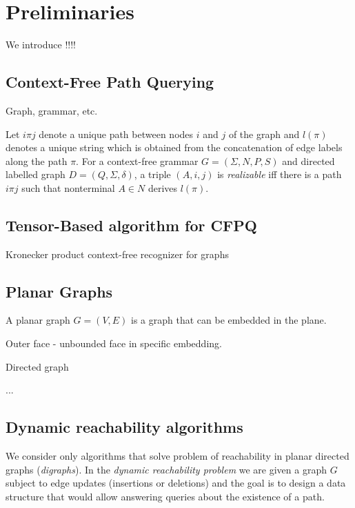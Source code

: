\section{Preliminaries}

We introduce !!!!

\subsection{Context-Free Path Querying}

Graph, grammar, etc.

Let $i\pi j$ denote a unique path between nodes $i$ and $j$ of the graph and $l(\pi)$ denotes a unique string which is obtained from the concatenation of edge labels along the path $\pi$.
For a context-free grammar $G = (\Sigma, N, P, S)$ and directed labelled graph $D = (Q, \Sigma, \delta)$, a triple $(A, i, j)$ is \textit{realizable} iff there is a path $i\pi j$ such that nonterminal $A \in N$ derives $l(\pi)$.

\subsection{Tensor-Based algorithm for CFPQ}

\begin{algorithm}[H]
\begin{algorithmic}[1]
\caption{Kronecker product context-free recognizer for graphs}
\label{alg:Kronecker}
\EndFunction
\end{algorithmic}
\end{algorithm}

\subsection{Planar Graphs}

A planar graph $G = (V, E)$ is a graph that can be embedded in the plane.

Outer face - unbounded face in specific embedding.

Directed graph

...

\subsection{Dynamic reachability algorithms}

We consider only algorithms that solve problem of reachability in planar directed graphs (\textit{digraphs}). In the \textit{dynamic reachability problem} we are given a graph $G$ subject to edge updates (insertions or deletions) and the goal is to design a data structure that would allow answering queries about the existence of a path.

